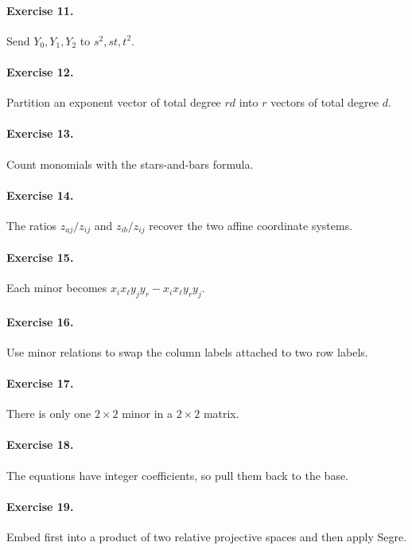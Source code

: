 \paragraph{Exercise 11.} Send \(Y_0,Y_1,Y_2\) to \(s^2,st,t^2\).

\paragraph{Exercise 12.} Partition an exponent vector of total degree \(rd\) into \(r\) vectors of total degree \(d\).

\paragraph{Exercise 13.} Count monomials with the stars-and-bars formula.

\paragraph{Exercise 14.} The ratios \(z_{aj}/z_{ij}\) and \(z_{ib}/z_{ij}\) recover the two affine coordinate systems.

\paragraph{Exercise 15.} Each minor becomes \(x_i x_\ell y_j y_r-x_i x_\ell y_r y_j\).

\paragraph{Exercise 16.} Use minor relations to swap the column labels attached to two row labels.

\paragraph{Exercise 17.} There is only one \(2\times2\) minor in a \(2\times2\) matrix.

\paragraph{Exercise 18.} The equations have integer coefficients, so pull them back to the base.

\paragraph{Exercise 19.} Embed first into a product of two relative projective spaces and then apply Segre.

